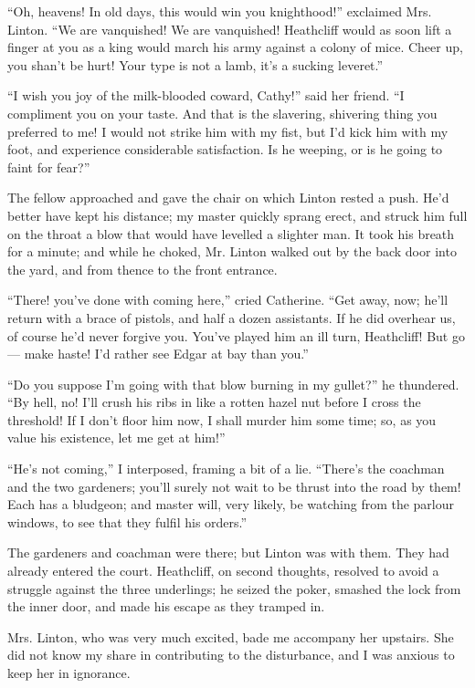\par “Oh, heavens! In old days, this would win you knighthood!” exclaimed Mrs. Linton. “We are vanquished! We are vanquished! Heathcliff would as soon lift a finger at you as a king would march his army against a colony of mice. Cheer up, you shan't be hurt! Your type is not a lamb, it's a sucking leveret.”
\par “I wish you joy of the milk-blooded coward, Cathy!” said her friend. “I compliment you on your taste. And that is the slavering, shivering thing you preferred to me! I would not strike him with my fist, but I'd kick him with my foot, and experience considerable satisfaction. Is he weeping, or is he going to faint for fear?”
\par The fellow approached and gave the chair on which Linton rested a push. He'd better have kept his distance; my master quickly sprang erect, and struck him full on the throat a blow that would have levelled a slighter man. It took his breath for a minute; and while he choked, Mr. Linton walked out by the back door into the yard, and from thence to the front entrance.
\par “There! you've done with coming here,” cried Catherine. “Get away, now; he'll return with a brace of pistols, and half a dozen assistants. If he did overhear us, of course he'd never forgive you. You've played him an ill turn, Heathcliff! But go — make haste! I'd rather see Edgar at bay than you.”
\par “Do you suppose I'm going with that blow burning in my gullet?” he thundered. “By hell, no! I'll crush his ribs in like a rotten hazel nut before I cross the threshold! If I don't floor him now, I shall murder him some time; so, as you value his existence, let me get at him!”
\par “He's not coming,” I interposed, framing a bit of a lie. “There's the coachman and the two gardeners; you'll surely not wait to be thrust into the road by them! Each has a bludgeon; and master will, very likely, be watching from the parlour windows, to see that they fulfil his orders.”
\par The gardeners and coachman were there; but Linton was with them. They had already entered the court. Heathcliff, on second thoughts, resolved to avoid a struggle against the three underlings; he seized the poker, smashed the lock from the inner door, and made his escape as they tramped in.
\par Mrs. Linton, who was very much excited, bade me accompany her upstairs. She did not know my share in contributing to the disturbance, and I was anxious to keep her in ignorance.
